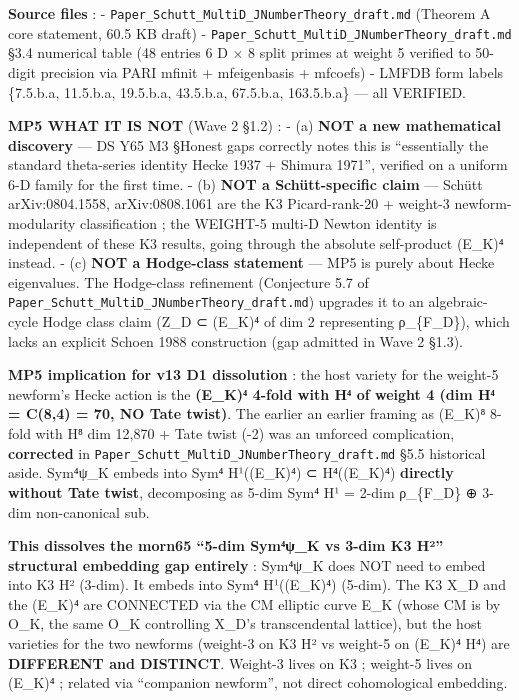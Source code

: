 \documentclass[
  11pt,
  a4paper,
]{article}
\begin{document}
\textbf{Source files} :
- \texttt{Paper\_Schutt\_MultiD\_JNumberTheory\_draft.md} (Theorem A core statement, 60.5 KB draft)
- \texttt{Paper\_Schutt\_MultiD\_JNumberTheory\_draft.md} §3.4 numerical table (48 entries 6 D × 8 split primes at weight 5 verified to 50-digit precision via PARI mfinit + mfeigenbasis + mfcoefs)
- LMFDB form labels \{7.5.b.a, 11.5.b.a, 19.5.b.a, 43.5.b.a, 67.5.b.a, 163.5.b.a\} --- all VERIFIED.

\textbf{MP5 WHAT IT IS NOT} (Wave 2 §1.2) :
- (a) \textbf{NOT a new mathematical discovery} --- DS Y65 M3 §Honest gaps correctly notes this is ``essentially the standard theta-series identity Hecke 1937 + Shimura 1971'', verified on a uniform 6-D family for the first time.
- (b) \textbf{NOT a Schütt-specific claim} --- Schütt arXiv:0804.1558, arXiv:0808.1061 are the K3 Picard-rank-20 + weight-3 newform-modularity classification ; the WEIGHT-5 multi-D Newton identity is independent of these K3 results, going through the absolute self-product (E\_K)⁴ instead.
- (c) \textbf{NOT a Hodge-class statement} --- MP5 is purely about Hecke eigenvalues. The Hodge-class refinement (Conjecture 5.7 of \texttt{Paper\_Schutt\_MultiD\_JNumberTheory\_draft.md}) upgrades it to an algebraic-cycle Hodge class claim (Z\_D ⊂ (E\_K)⁴ of dim 2 representing ρ\_\{F\_D\}), which lacks an explicit Schoen 1988 construction (gap admitted in Wave 2 §1.3).

\textbf{MP5 implication for v13 D1 dissolution} : the host variety for the weight-5 newform's Hecke action is the \textbf{(E\_K)⁴ 4-fold with H⁴ of weight 4 (dim H⁴ = C(8,4) = 70, NO Tate twist)}. The earlier an earlier framing as (E\_K)⁸ 8-fold with H⁸ dim 12,870 + Tate twist (-2) was an unforced complication, \textbf{corrected} in \texttt{Paper\_Schutt\_MultiD\_JNumberTheory\_draft.md} §5.5 historical aside. Sym⁴ψ\_K embeds into Sym⁴ H¹((E\_K)⁴) ⊂ H⁴((E\_K)⁴) \textbf{directly without Tate twist}, decomposing as 5-dim Sym⁴ H¹ = 2-dim ρ\_\{F\_D\} ⊕ 3-dim non-canonical sub.

\textbf{This dissolves the morn65 ``5-dim Sym⁴ψ\_K vs 3-dim K3 H²'' structural embedding gap entirely} : Sym⁴ψ\_K does NOT need to embed into K3 H² (3-dim). It embeds into Sym⁴ H¹((E\_K)⁴) (5-dim). The K3 X\_D and the (E\_K)⁴ are CONNECTED via the CM elliptic curve E\_K (whose CM is by O\_K, the same O\_K controlling X\_D's transcendental lattice), but the host varieties for the two newforms (weight-3 on K3 H² vs weight-5 on (E\_K)⁴ H⁴) are \textbf{DIFFERENT and DISTINCT}. Weight-3 lives on K3 ; weight-5 lives on (E\_K)⁴ ; related via ``companion newform'', not direct cohomological embedding.
\end{document}
